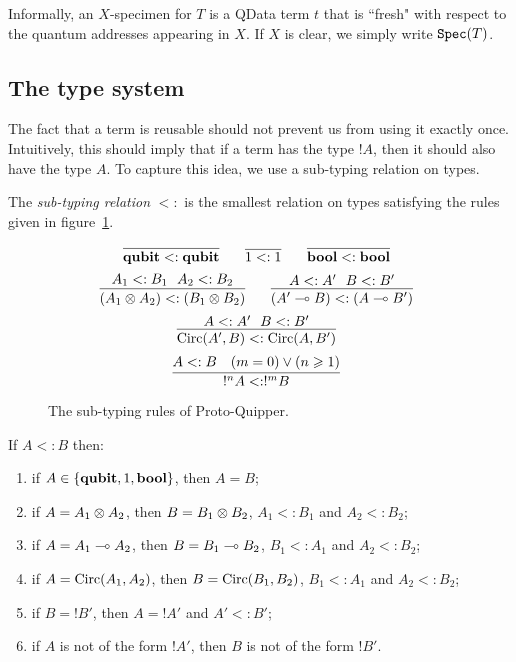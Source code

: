 \documentclass[twoside]{article}
\begin{document}

Informally, an $X$-specimen for $T$ is a QData term $t$ that is 
``fresh" with respect to the quantum addresses appearing in $X$.
If $X$ is clear, we simply write $\texttt{Spec} (T)$.


\subsection{The type system}

The fact that a term is reusable should not prevent us from 
using it exactly once. Intuitively, this should imply that if a 
term has the type $!A$, then it should also have the type $A$. 
To capture this idea, we use a sub-typing relation on types.

\begin{definition}
The \emph{sub-typing relation} $<:$ is the smallest relation on 
types satisfying the rules given in 
figure~\hyperref[subtyping_congruences]{\ref*{subtyping_congruences}}.
\end{definition}

\begin{figure}[!ht]
\begin{mdframed}
\[
  \infer[]{\qubit <: \qubit}{}
~~~~
  \infer[]{1 <: 1}{}
~~~~
  \infer[]{\bool <: \bool}{}
\]
\[
  \infer[]{ (A_1\x A_2) <:  (B_1 \x B_2)}{A_1<:B_1~~A_2<:B_2}
~~~~
  \infer[]{ (A'\loli B) <: (A\loli B')}{A<:A'~~B<:B'}
\]
\[
  \infer[]{ \Circ(A', B) <:  \Circ(A, B')}{A<:A'~~B<:B'}
\]
\[
  \infer[]{ !^nA <: !^mB}{
    A<:B
    &
    (m=0)\vee (n\geq 1)
  }
\]
%
\end{mdframed}
\caption{The sub-typing rules of Proto-Quipper.}
\label{subtyping_congruences}
\end{figure}

\begin{remark}
\label{subtyping_shape}
If $A<:B$ then:
\begin{enumerate}
  \item if $A\in\{\textrm{\bf qubit}, 1, \textrm{\bf bool}\}$, then $A=B$;
  \item if $A=A_1\otimes A_2$, then $B=B_1\otimes B_2$, 
  $A_1<:B_1$ and $A_2<:B_2$;
  \item if $A=A_1\multimap A_2$, then $B=B_1\multimap B_2$, 
  $B_1<:A_1$ and $A_2<:B_2$;
  \item if $A=\mathop{\textrm{Circ}}\nolimits(A_1, A_2)$, then $B=\mathop{\textrm{Circ}}\nolimits(B_1,B_2)$, 
  $B_1<:A_1$ and $A_2<:B_2$;
  \item if $B=!B'$, then $A=!A'$ and $A'<:B'$;\label{subtype_bang}
  \item if $A$ is not of the form $!A'$, then $B$ is not 
  of the form $!B'$.
\end{enumerate}
\end{remark}
\end{document}
